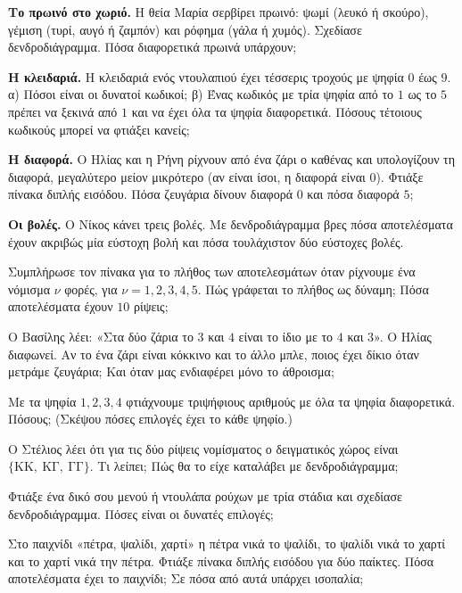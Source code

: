 \ex \textbf{Το πρωινό στο χωριό.} Η θεία Μαρία σερβίρει πρωινό: ψωμί (λευκό ή σκούρο), γέμιση (τυρί, αυγό ή ζαμπόν) και ρόφημα (γάλα ή χυμός). Σχεδίασε δενδροδιάγραμμα. Πόσα διαφορετικά πρωινά υπάρχουν;

\ex \textbf{Η κλειδαριά.} Η κλειδαριά ενός ντουλαπιού έχει τέσσερις τροχούς με ψηφία $0$ έως $9$. α) Πόσοι είναι οι δυνατοί κωδικοί; β) Ένας κωδικός με τρία ψηφία από το $1$ ως το $5$ πρέπει να ξεκινά από $1$ και να έχει όλα τα ψηφία διαφορετικά. Πόσους τέτοιους κωδικούς μπορεί να φτιάξει κανείς;

\ex \textbf{Η διαφορά.} Ο Ηλίας και η Ρήνη ρίχνουν από ένα ζάρι ο καθένας και υπολογίζουν τη διαφορά, μεγαλύτερο μείον μικρότερο (αν είναι ίσοι, η διαφορά είναι $0$). Φτιάξε πίνακα διπλής εισόδου. Πόσα ζευγάρια δίνουν διαφορά $0$ και πόσα διαφορά $5$;

\ex \textbf{Οι βολές.} Ο Νίκος κάνει τρεις βολές. Με δενδροδιάγραμμα βρες πόσα αποτελέσματα έχουν ακριβώς μία εύστοχη βολή και πόσα τουλάχιστον δύο εύστοχες βολές.


\ex Συμπλήρωσε τον πίνακα για το πλήθος των αποτελεσμάτων όταν ρίχνουμε ένα νόμισμα $\nu$ φορές, για $\nu=1,2,3,4,5$. Πώς γράφεται το πλήθος ως δύναμη; Πόσα αποτελέσματα έχουν $10$ ρίψεις;

\ex Ο Βασίλης λέει: «Στα δύο ζάρια το $3$ και $4$ είναι το ίδιο με το $4$ και $3$». Ο Ηλίας διαφωνεί. Αν το ένα ζάρι είναι κόκκινο και το άλλο μπλε, ποιος έχει δίκιο όταν μετράμε ζευγάρια; Και όταν μας ενδιαφέρει μόνο το άθροισμα;

\ex Με τα ψηφία $1,2,3,4$ φτιάχνουμε τριψήφιους αριθμούς με όλα τα ψηφία διαφορετικά. Πόσους; (Σκέψου πόσες επιλογές έχει το κάθε ψηφίο.)

\ex Ο Στέλιος λέει ότι για τις δύο ρίψεις νομίσματος ο δειγματικός χώρος είναι $\{\mathrm{ΚΚ},\ \mathrm{ΚΓ},\ \mathrm{ΓΓ}\}$. Τι λείπει; Πώς θα το είχε καταλάβει με δενδροδιάγραμμα;


\ex Φτιάξε ένα δικό σου μενού ή ντουλάπα ρούχων με τρία στάδια και σχεδίασε δενδροδιάγραμμα. Πόσες είναι οι δυνατές επιλογές;

\ex Στο παιχνίδι «πέτρα, ψαλίδι, χαρτί» η πέτρα νικά το ψαλίδι, το ψαλίδι νικά το χαρτί και το χαρτί νικά την πέτρα. Φτιάξε πίνακα διπλής εισόδου για δύο παίκτες. Πόσα αποτελέσματα έχει το παιχνίδι; Σε πόσα από αυτά υπάρχει ισοπαλία;
